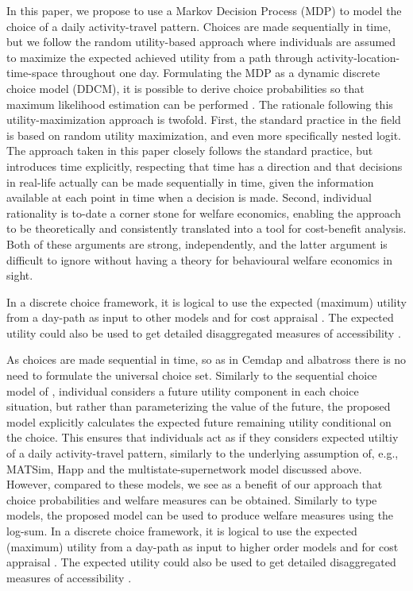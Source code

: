 In this paper, we propose to use a Markov Decision Process (MDP) to model the choice of a daily activity-travel pattern. 
Choices are made sequentially in time, but we follow the random utility-based approach where individuals are assumed to maximize the expected achieved utility from a path through activity-location-time-space throughout one day. Formulating the MDP as a dynamic discrete choice model (DDCM), it is possible to derive choice probabilities so that maximum likelihood estimation can be performed \citep{RustML88}.
The rationale following this utility-maximization approach is twofold. First, the standard practice in the field is based on random utility maximization, and even more specifically nested logit. The approach taken in this paper closely follows the standard practice, but introduces time explicitly, respecting that time has a direction and that decisions in real-life actually can be made sequentially in time, given the information available at each point in time when a decision is made. Second, individual rationality is to-date a corner stone for welfare economics, enabling the approach to be theoretically and consistently translated into a tool for cost-benefit analysis. Both of these arguments are strong, independently, and the latter argument is difficult to ignore without having a theory for behavioural welfare economics in sight. 

In a discrete choice framework, it is logical to use the expected (maximum) utility from a day-path as input to other models and for cost appraisal \citep{Geurs10}. The expected utility could also be used to get detailed disaggregated measures of accessibility \citep{Dong06, Jonsson13}.

As choices are made sequential in time, so as in Cemdap and albatross there is no need to formulate the universal choice set. Similarly to the sequential choice model of \citep{Habib11RUM}, individual considers a future utility component in each choice situation, but rather than parameterizing the value of the future, the proposed model explicitly calculates the expected future remaining utility conditional on the choice. This ensures that individuals act as if they considers expected utiltiy of a daily activity-travel pattern, similarly to the underlying assumption of, e.g., MATSim, Happ and the multistate-supernetwork model discussed above. However, compared to these models, we see as a benefit of our approach that choice probabilities and welfare measures can be obtained.
Similarly to \citep{Bowman01} type models, the proposed model can be used to produce welfare measures using the log-sum. In a discrete choice framework, it is logical to use the expected (maximum) utility from a day-path as input to higher order models and for cost appraisal \citep{Geurs10}. The expected utility could also be used to get detailed disaggregated measures of accessibility \citep{Dong06}.

